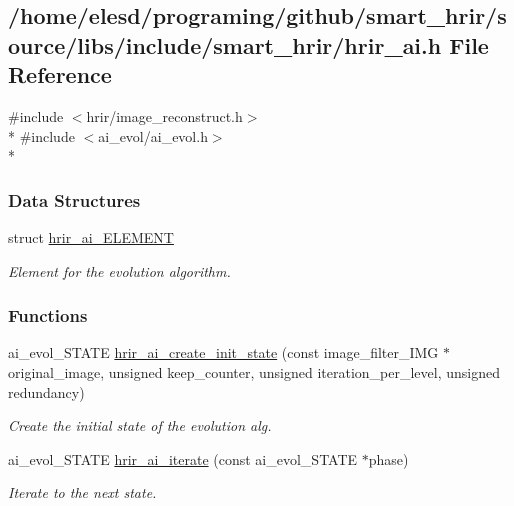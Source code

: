 \hypertarget{a00004}{\subsection{/home/elesd/programing/github/smart\-\_\-hrir/source/libs/include/smart\-\_\-hrir/hrir\-\_\-ai.h File Reference}
\label{a00004}
}
{\ttfamily \#include $<$hrir/image\-\_\-reconstruct.\-h$>$}\\*
{\ttfamily \#include $<$ai\-\_\-evol/ai\-\_\-evol.\-h$>$}\\*
\subsubsection*{Data Structures}
\begin{DoxyCompactItemize}
\item 
struct \hyperlink{a00001}{hrir\-\_\-ai\-\_\-\-E\-L\-E\-M\-E\-N\-T}
\begin{DoxyCompactList}\small\item\em Element for the evolution algorithm. \end{DoxyCompactList}\end{DoxyCompactItemize}
\subsubsection*{Functions}
\begin{DoxyCompactItemize}
\item 
ai\-\_\-evol\-\_\-\-S\-T\-A\-T\-E \hyperlink{a00004_a9f1b69c513955afd2b4598424e9fe0d5}{hrir\-\_\-ai\-\_\-create\-\_\-init\-\_\-state} (const image\-\_\-filter\-\_\-\-I\-M\-G $\ast$original\-\_\-image, unsigned keep\-\_\-counter, unsigned iteration\-\_\-per\-\_\-level, unsigned redundancy)
\begin{DoxyCompactList}\small\item\em Create the initial state of the evolution alg. \end{DoxyCompactList}\item 
ai\-\_\-evol\-\_\-\-S\-T\-A\-T\-E \hyperlink{a00004_a58cf4d2cd73bd42bcfe5798aaa6c9956}{hrir\-\_\-ai\-\_\-iterate} (const ai\-\_\-evol\-\_\-\-S\-T\-A\-T\-E $\ast$phase)
\begin{DoxyCompactList}\small\item\em Iterate to the next state. \end{DoxyCompactList}\end{DoxyCompactItemize}


